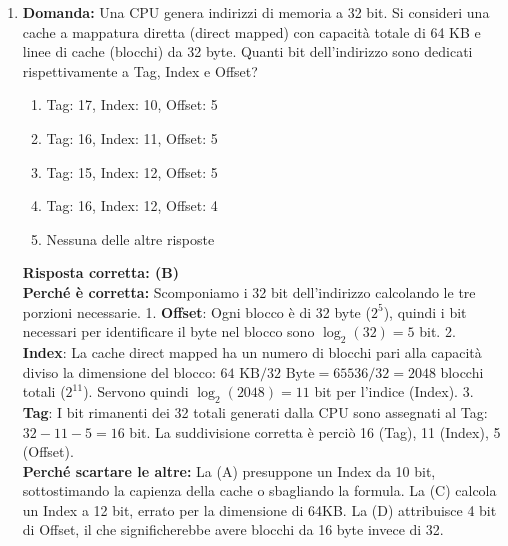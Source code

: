 \documentclass[12pt, a4paper]{article}
\begin{document}
\begin{enumerate}
    \item \textbf{Domanda:} Una CPU genera indirizzi di memoria a 32 bit. Si consideri una cache a mappatura diretta (direct mapped) con capacità totale di 64 KB e linee di cache (blocchi) da 32 byte. Quanti bit dell'indirizzo sono dedicati rispettivamente a Tag, Index e Offset?
    \begin{enumerate}[label=(\Alph*)]
        \item Tag: 17, Index: 10, Offset: 5
        \item Tag: 16, Index: 11, Offset: 5
        \item Tag: 15, Index: 12, Offset: 5
        \item Tag: 16, Index: 12, Offset: 4
        \item Nessuna delle altre risposte
    \end{enumerate}
    \textbf{Risposta corretta: (B)} \\
    \textbf{Perché è corretta:} Scomponiamo i 32 bit dell'indirizzo calcolando le tre porzioni necessarie. 
    1. \textbf{Offset}: Ogni blocco è di 32 byte ($2^5$), quindi i bit necessari per identificare il byte nel blocco sono $\log_2(32) = 5$ bit.
    2. \textbf{Index}: La cache direct mapped ha un numero di blocchi pari alla capacità diviso la dimensione del blocco: $64\text{ KB} / 32\text{ Byte} = 65536 / 32 = 2048$ blocchi totali ($2^{11}$). Servono quindi $\log_2(2048) = 11$ bit per l'indice (Index).
    3. \textbf{Tag}: I bit rimanenti dei 32 totali generati dalla CPU sono assegnati al Tag: $32 - 11 - 5 = 16$ bit. 
    La suddivisione corretta è perciò 16 (Tag), 11 (Index), 5 (Offset). \\
    \textbf{Perché scartare le altre:} La (A) presuppone un Index da 10 bit, sottostimando la capienza della cache o sbagliando la formula. La (C) calcola un Index a 12 bit, errato per la dimensione di 64KB. La (D) attribuisce 4 bit di Offset, il che significherebbe avere blocchi da 16 byte invece di 32.


\end{enumerate}
\end{document}
